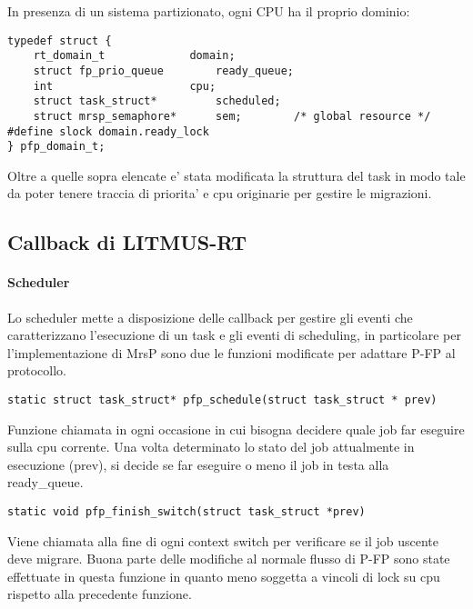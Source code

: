 \documentclass[a4paper,11pt]{article}
\begin{document}
\noindent In presenza di un sistema partizionato, ogni CPU ha il proprio dominio:

\begin{lstlisting}
typedef struct {
	rt_domain_t 			domain;
	struct fp_prio_queue		ready_queue;
	int          			cpu;			
	struct task_struct* 		scheduled; 		
	struct mrsp_semaphore* 		sem;		/* global resource */
#define slock domain.ready_lock
} pfp_domain_t;
\end{lstlisting}
\hspace{0.2mm}

\noindent Oltre a quelle sopra elencate e' stata modificata la struttura del task in modo tale da poter tenere traccia di priorita' e cpu originarie per gestire le migrazioni.\\

\subsection{Callback di LITMUS-RT}

\paragraph{Scheduler}

\noindent Lo scheduler mette a disposizione delle callback per gestire gli eventi che caratterizzano l'esecuzione di un task e gli eventi di scheduling, in particolare per l'implementazione di MrsP sono due le funzioni modificate per adattare P-FP al protocollo.

\hspace{0.2mm}

\begin{lstlisting}
static struct task_struct* pfp_schedule(struct task_struct * prev)
\end{lstlisting}

\noindent Funzione chiamata in ogni occasione in cui bisogna decidere quale job far eseguire sulla cpu corrente. Una volta determinato lo stato del job attualmente in esecuzione (prev), si decide se far eseguire o meno il job in testa alla ready\_queue.

\hspace{0.2mm}

\begin{lstlisting}
static void pfp_finish_switch(struct task_struct *prev)
\end{lstlisting}
\noindent Viene chiamata alla fine di ogni context switch per verificare se il job uscente deve migrare. Buona parte delle modifiche al normale flusso di P-FP sono state effettuate in questa funzione in quanto meno soggetta a vincoli di lock su cpu rispetto alla precedente funzione.\\
\end{document}
